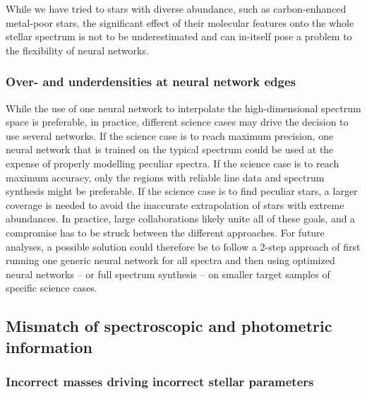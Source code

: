 \documentclass[
  journal=pasa,
  manuscript=research-paper, %
  year=2024,
  volume=37
]{cup-journal}
\begin{document}
While we have tried to stars with diverse abundance, such as carbon-enhanced metal-poor stars, the significant effect of their molecular features onto the whole stellar spectrum is not to be underestimated and can in-itself pose a problem to the flexibility of neural networks.

\subsubsection{Over- and underdensities at neural network edges}

While the use of one neural network to interpolate the high-dimensional spectrum space is preferable, in practice, different science cases may drive the decision to use several networks.
If the science case is to reach maximum precision, one neural network that is trained on the typical spectrum could be used at the expense of properly modelling peculiar spectra.
If the science case is to reach maximum accuracy, only the regions with reliable line data and spectrum synthesis might be preferable.
If the science case is to find peculiar stars, a larger coverage is needed to avoid the inaccurate extrapolation of stars with extreme abundances.
In practice, large collaborations likely unite all of these goals, and a compromise has to be struck between the different approaches.
For future analyses, a possible solution could therefore be to follow a 2-step approach of first running one generic neural network for all spectra and then using optimized neural networks -- or full spectrum synthesis -- on smaller target samples of specific science cases.

\subsection{Mismatch of spectroscopic and photometric information} \label{sec:caveats_photospec}

\subsubsection{Incorrect masses driving incorrect stellar parameters}
\end{document}

